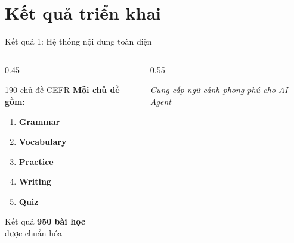 \documentclass[notheorems,hyperref={bookmarks=true}]{beamer}
\begin{document}
\section{Kết quả triển khai}

\begin{frame}{Kết quả 1: Hệ thống nội dung toàn diện}
\begin{columns}
    \begin{column}{0.45\textwidth}
        \begin{block}{190 chủ đề CEFR}
            \textbf{Mỗi chủ đề gồm:}
            \begin{enumerate}
                \item \textbf{Grammar}
                \item \textbf{Vocabulary}
                \item \textbf{Practice}
                \item \textbf{Writing}
                \item \textbf{Quiz}
            \end{enumerate}
        \end{block}
        
        \vspace{0.3cm}
        
        \begin{alertblock}{Kết quả}
            \centering
            \Large \textbf{950 bài học}\\
            \small được chuẩn hóa
        \end{alertblock}
    \end{column}
    \begin{column}{0.55\textwidth}
        \centering
        
        
        \vspace{0.3cm}
        {\footnotesize \textit{Cung cấp ngữ cảnh phong phú cho AI Agent}}
    \end{column}
\end{columns}
\end{frame}
\end{document}
